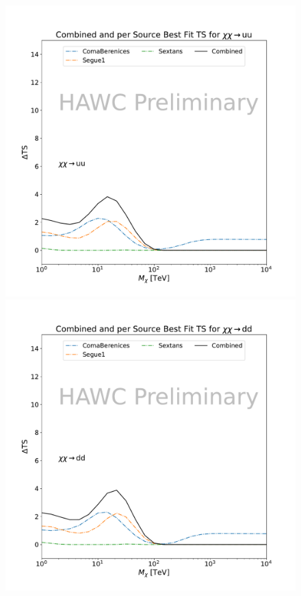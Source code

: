\begin{figure}[h]
{    \includegraphics[scale=0.21]{figures/mtd_hawc_dm/results/CombinedTS_New_duck_uu_.pdf}
    \includegraphics[scale=0.21]{figures/mtd_hawc_dm/results/CombinedTS_New_duck_dd_.pdf}
}
\end{figure}
